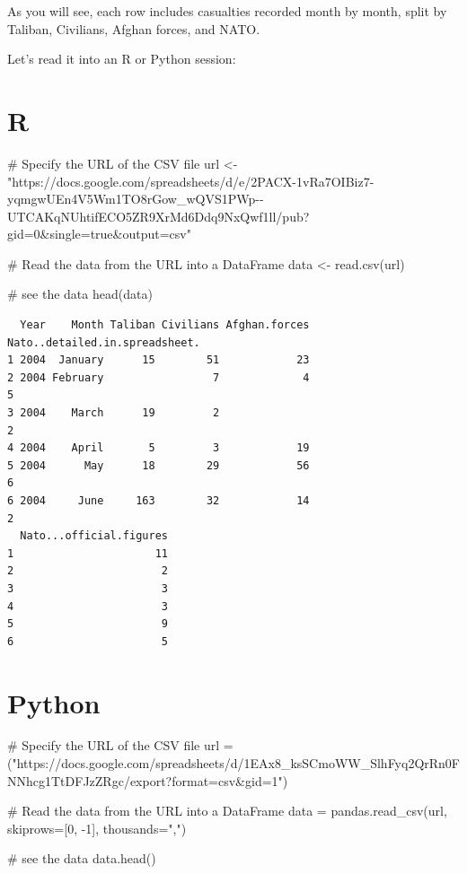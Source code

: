 \documentclass[
  letterpaper,
  DIV=11,
  numbers=noendperiod]{scrreprt}
\newenvironment{Shaded}{\begin{snugshade}}{\end{snugshade}}
\newcommand{\CommentTok}[1]{\textcolor[rgb]{0.37,0.37,0.37}{#1}}
\newcommand{\DecValTok}[1]{\textcolor[rgb]{0.68,0.00,0.00}{#1}}
\newcommand{\FunctionTok}[1]{\textcolor[rgb]{0.28,0.35,0.67}{#1}}
\newcommand{\NormalTok}[1]{\textcolor[rgb]{0.00,0.23,0.31}{#1}}
\newcommand{\OperatorTok}[1]{\textcolor[rgb]{0.37,0.37,0.37}{#1}}
\newcommand{\OtherTok}[1]{\textcolor[rgb]{0.00,0.23,0.31}{#1}}
\newcommand{\StringTok}[1]{\textcolor[rgb]{0.13,0.47,0.30}{#1}}
\begin{document}
As you will see, each row includes casualties recorded month by month,
split by Taliban, Civilians, Afghan forces, and NATO.

Let's read it into an R or Python session:

\section{R}

\begin{Shaded}
\begin{Highlighting}[]
\CommentTok{\# Specify the URL of the CSV file}
\NormalTok{url }\OtherTok{\textless{}{-}} \StringTok{"https://docs.google.com/spreadsheets/d/e/2PACX{-}1vRa7OIBiz7{-}yqmgwUEn4V5Wm1TO8rGow\_wQVS1PWp{-}{-}UTCAKqNUhtifECO5ZR9XrMd6Ddq9NxQwf1ll/pub?gid=0\&single=true\&output=csv"}

\CommentTok{\# Read the data from the URL into a DataFrame}
\NormalTok{data }\OtherTok{\textless{}{-}} \FunctionTok{read.csv}\NormalTok{(url)}

\CommentTok{\# see the data}
\FunctionTok{head}\NormalTok{(data)}
\end{Highlighting}
\end{Shaded}

\begin{verbatim}
  Year    Month Taliban Civilians Afghan.forces Nato..detailed.in.spreadsheet.
1 2004  January      15        51            23                               
2 2004 February                 7             4                              5
3 2004    March      19         2                                            2
4 2004    April       5         3            19                               
5 2004      May      18        29            56                              6
6 2004     June     163        32            14                              2
  Nato...official.figures
1                      11
2                       2
3                       3
4                       3
5                       9
6                       5
\end{verbatim}

\section{Python}

\begin{Shaded}
\begin{Highlighting}[]
\CommentTok{\# Specify the URL of the CSV file}
\NormalTok{url }\OperatorTok{=}\NormalTok{ (}\StringTok{"https://docs.google.com/spreadsheets/d/1EAx8\_ksSCmoWW\_SlhFyq2QrRn0FNNhcg1TtDFJzZRgc/export?format=csv\&gid=1"}\NormalTok{)}

\CommentTok{\# Read the data from the URL into a DataFrame}
\NormalTok{data }\OperatorTok{=}\NormalTok{ pandas.read\_csv(url, skiprows}\OperatorTok{=}\NormalTok{[}\DecValTok{0}\NormalTok{, }\OperatorTok{{-}}\DecValTok{1}\NormalTok{], thousands}\OperatorTok{=}\StringTok{","}\NormalTok{)}

\CommentTok{\# see the data}
\NormalTok{data.head()}
\end{Highlighting}
\end{Shaded}
\end{document}
